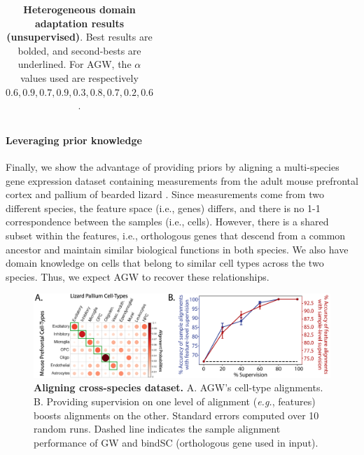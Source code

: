 \begin{table}[t]
\begin{center}
{\begin{tabular}{@{}lccccccccc@{}}
\bottomrule
\end{tabular}}
\end{center}
\caption{\label{tab:hda_agw}
\textbf{Heterogeneous domain adaptation results (unsupervised)}.
Best results are bolded, and second-bests are underlined. For AGW,
the $\alpha$ values used are respectively $0.6, 0.9, 0.7, 0.9, 0.3, 0.8, 0.7, 0.2, 0.6$. }
\end{table}

\paragraph{Leveraging prior knowledge}
Finally, we show the advantage of providing priors by aligning a
multi-species gene expression dataset containing measurements from
the adult mouse prefrontal cortex \citep{mouse} and pallium of bearded lizard \citep{lizard}.
Since measurements come from two different species, the feature space (i.e., genes) differs,
and there is no 1-1 correspondence between the samples (i.e., cells). However,
there is a shared subset within the features, i.e., orthologous genes that
descend from a common ancestor and maintain similar biological functions in both species.
We also have domain knowledge on cells that belong to similar cell types across the two species.
Thus, we expect AGW to recover these relationships.

\setlength{\columnsep}{10pt}%
\setlength{\intextsep}{0pt}
\begin{figure}[!t]
\centering
\includegraphics[width=0.85\linewidth]{./Chapitre5/fig/xSp_full.png}
\caption{\label{fig:xsp} \textbf{Aligning cross-species dataset.}
A. AGW's cell-type alignments.
B. Providing supervision on one level of alignment (\textit{e.g.}, features)
boosts alignments on the other. Standard errors computed over 10 random runs.
Dashed line indicates the sample alignment performance of GW and bindSC
(orthologous gene used in input).}
\end{figure}


